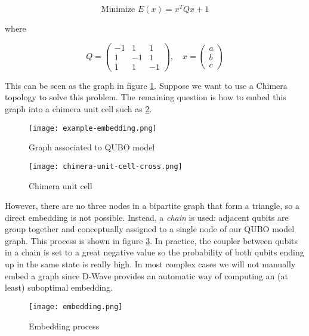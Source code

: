 $$ \text{Minimize } E(x) = x^T Q x + 1$$

where

$$
Q = 
\left(
\begin{array}{ccc}
	-1 & 1 & 1  \\
	1 & -1 & 1  \\
	1 & 1 & -1
\end{array}
\right), \quad
x = 
\left(
\begin{array}{c}
a  \\
b  \\
c
\end{array}
\right)
$$

This can be seen as the graph in figure \ref{fig:example-embedding}. Suppose we want to use a Chimera topology to solve this problem. The remaining question is how to embed this graph into a chimera unit cell such as \ref{fig:chimera-unit-cell-cross}. 

\begin{figure}[H]
	\texttt{[image: example-embedding.png]}
	\centering
	\caption{Graph associated to QUBO model \cite{DWaveDoc-MinorEmbedding}}
	\label{fig:example-embedding}
\end{figure}

\begin{figure}[H]
	\texttt{[image: chimera-unit-cell-cross.png]}
	\centering
	\caption{Chimera unit cell \cite{DWaveDoc-MinorEmbedding}}
	\label{fig:chimera-unit-cell-cross}
\end{figure}

However, there are no three nodes in a bipartite graph that form a triangle, so a direct embedding is not possible. Instead, a \emph{chain} is used: adjacent qubits are group together and conceptually assigned to a single node of our QUBO model graph. This process is shown in figure \ref{fig:embedding}. In practice, the coupler between qubits in a chain is set to a great negative value so the probability of both qubits ending up in the same state is really high. In most complex cases we will not manually embed a graph since D-Wave provides an automatic way of computing an (at least) suboptimal embedding.

\begin{figure}[H]
	\texttt{[image: embedding.png]}
	\centering
	\caption{Embedding process \cite{DWaveDoc-MinorEmbedding}}
	\label{fig:embedding}
\end{figure}
